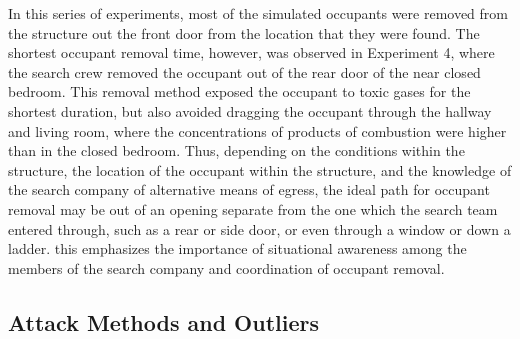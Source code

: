 \documentclass[12pt,oneside]{article}
\begin{document}
In this series of experiments, most of the simulated occupants were removed from the structure out the front door from the location that they were found. The shortest occupant removal time, however, was observed in Experiment 4, where the search crew removed the occupant out of the rear door of the near closed bedroom. This removal method exposed the occupant to toxic gases for the shortest duration, but also avoided dragging the occupant through the hallway and living room, where the  concentrations of products of combustion were higher than in the closed bedroom. Thus, depending on the conditions within the structure, the location of the occupant within the structure, and the knowledge of the search company of alternative means of egress, the ideal path for occupant removal may be out of an opening separate from the one which the search team entered through, such as a rear or side door, or even through a window or down a ladder. this emphasizes the importance of situational awareness among the members of the search company and coordination of occupant removal. 

\subsection{Attack Methods and Outliers}
\label{subsec:fire_attack}
\end{document}
